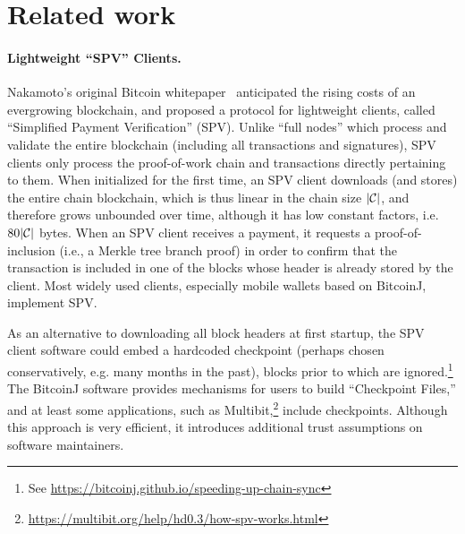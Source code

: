 \section{Related work}

\paragraph{Lightweight ``SPV'' Clients.}
Nakamoto's original Bitcoin whitepaper~\cite{bitcoin} anticipated the rising costs of an evergrowing blockchain, and proposed a protocol for lightweight clients, called ``Simplified Payment Verification'' (SPV). Unlike ``full nodes'' which process and validate the entire blockchain (including all transactions and signatures), SPV clients only process the proof-of-work chain and transactions directly pertaining to them.
When initialized for the first time, an SPV client downloads (and stores) the
entire chain blockchain, which is thus linear in the chain size $|\mathcal{C}|$, and
therefore grows unbounded over time, although it has low constant factors, i.e.
$80|\mathcal{C}|$ bytes.
When an SPV client receives a payment, it requests a proof-of-inclusion (i.e., a Merkle tree branch proof) in order to confirm that the transaction is included in one of the blocks whose header is already stored by the client.
Most widely used clients, especially mobile wallets based on BitcoinJ, implement SPV.


As an alternative to downloading all block headers at first startup, the SPV client software could embed a hardcoded checkpoint (perhaps chosen conservatively, e.g. many months in the past), blocks prior to which are ignored.\footnote{See \url{https://bitcoinj.github.io/speeding-up-chain-sync}} The BitcoinJ software provides mechanisms for users to build ``Checkpoint Files,'' and at least some applications, such as Multibit,\footnote{\url{https://multibit.org/help/hd0.3/how-spv-works.html}} include checkpoints. Although this approach is very efficient, it introduces additional trust assumptions on software maintainers.

